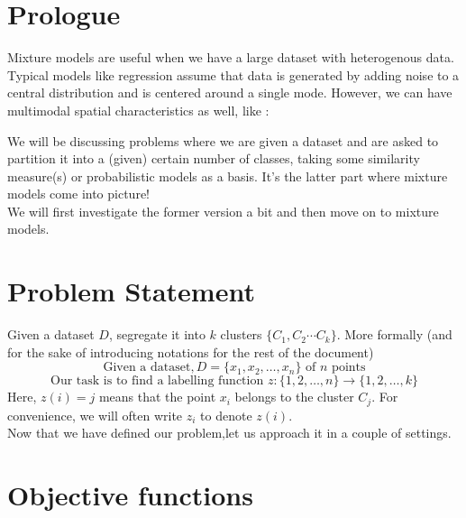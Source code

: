 \documentclass[12pt]{article}
\begin{document}
	\MakeScribeTop


\section{Prologue}
Mixture models are useful when we have a large dataset with heterogenous data. \\
Typical models like regression assume that data is generated by adding noise to a central distribution and is centered around a single mode. However, we can have multimodal spatial characteristics as well, like :
{}

We will be discussing problems where we are given a dataset and are asked to partition it into a (given) certain number of classes, taking some similarity measure(s) or probabilistic models as a basis. It's the latter part where mixture models come into picture!\\
We will first investigate the former version a bit and then move on to mixture models.

\section{Problem Statement}

Given a dataset $D$, segregate it into $k$ clusters $\{C_1,C_2 \cdots C_k\}$. More formally (and for the sake of introducing notations for the rest of the document)
$$\text{Given a dataset}, D=\{x_1,x_2, \dots, x_n\} \text{ of } n  \text{ points}$$
$$\text{Our task is to find a labelling function } z:\{1,2,\dots, n\} \rightarrow \{1,2,\dots, k\}$$
Here, $z(i)=j$ means that the point $x_i$ belongs to the cluster $C_j$. For convenience, we will often write $z_i$ to denote $z(i)$.\\
Now that we have defined our problem,let us approach it in a couple of settings.

\section{Objective functions}
\end{document}
